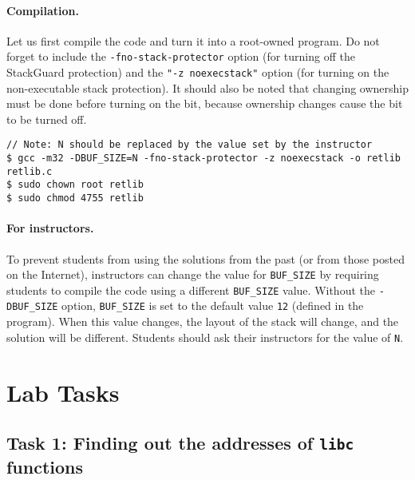 \vspace{0.1in}
\paragraph{Compilation.}
Let us first compile the code and turn it into a root-owned \setuid
program. Do not forget to include the 
\texttt{-fno-stack-protector} option (for turning off the StackGuard
protection) and the \texttt{"-z noexecstack"} option (for turning on
the non-executable stack protection). 
It should also be noted that changing ownership must be done before
turning on the \setuid bit, 
because ownership changes cause the \setuid bit to be turned off.


\begin{lstlisting}
// Note: N should be replaced by the value set by the instructor
$ gcc -m32 -DBUF_SIZE=N -fno-stack-protector -z noexecstack -o retlib retlib.c
$ sudo chown root retlib           
$ sudo chmod 4755 retlib           
\end{lstlisting}


\paragraph{For instructors.}
To prevent students from using the solutions from the past (or from those
posted on the Internet), instructors can change the
value for \texttt{BUF\_SIZE} by requiring students to compile the
code using a different \texttt{BUF\_SIZE} value.
Without the \texttt{-DBUF\_SIZE}
option, \texttt{BUF\_SIZE} is set to the default value \texttt{12} (defined
in the program).
When this value changes, the layout of the stack
will change, and the solution will be different.
Students should ask their instructors for
the value of \texttt{N}.



\section{Lab Tasks}


\subsection{Task 1: Finding out the addresses of \texttt{libc} functions} 

